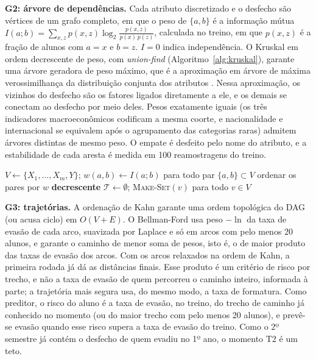 \textbf{G2: árvore de dependências.} Cada atributo discretizado e o desfecho são vértices de um grafo completo, em que o peso de $\{a,b\}$ é a informação mútua
$I(a;b)=\sum_{x,z} p(x,z)\log_2\frac{p(x,z)}{p(x)\,p(z)}$,
calculada no treino, em que $p(x,z)$ é a fração de alunos com $a=x$ e $b=z$. $I=0$ indica independência. O Kruskal em ordem decrescente de peso, com \textit{union-find} (Algoritmo~\ref{alg:kruskal}), garante uma árvore geradora de peso máximo, que é a aproximação em árvore de máxima verossimilhança da distribuição conjunta dos atributos \citep{chow1968}. Nessa aproximação, os vizinhos do desfecho são os fatores ligados diretamente a ele, e os demais se conectam ao desfecho por meio deles. Pesos exatamente iguais (os três indicadores macroeconômicos codificam a mesma coorte, e nacionalidade e internacional se equivalem após o agrupamento das categorias raras) admitem árvores distintas de mesmo peso. O empate é desfeito pelo nome do atributo, e a estabilidade de cada aresta é medida em 100 reamostragens do treino.

\begin{algorithm}[ht!]
\small
\algportugues
{}
$V \leftarrow \{X_1,\dots,X_m,Y\}$; \quad $w(a,b) \leftarrow I(a;b)$ para todo par $\{a,b\}\subset V$\;
ordenar os pares por $w$ \textbf{decrescente} 
$\mathcal{T} \leftarrow \emptyset$; \textsc{Make-Set}$(v)$ para todo $v\in V$\;
\;
\caption{Árvore geradora máxima de informação mútua (Kruskal)}
\label{alg:kruskal}
\end{algorithm}

\textbf{G3: trajetórias.} A ordenação de Kahn garante uma ordem topológica do DAG (ou acusa ciclo) em $O(V+E)$. O Bellman-Ford usa peso $-\ln$ da taxa de evasão de cada arco, suavizada por Laplace e só em arcos com pelo menos 20 alunos, e garante o caminho de menor soma de pesos, isto é, o de maior produto das taxas de evasão dos arcos. Com os arcos relaxados na ordem de Kahn, a primeira rodada já dá as distâncias finais. Esse produto é um critério de risco por trecho, e não a taxa de evasão de quem percorreu o caminho inteiro, informada à parte; a trajetória mais segura usa, do mesmo modo, a taxa de formatura. Como preditor, o risco do aluno é a taxa de evasão, no treino, do trecho de caminho já conhecido no momento (ou do maior trecho com pelo menos 20 alunos), e prevê-se evasão quando esse risco supera a taxa de evasão do treino. Como o 2º semestre já contém o desfecho de quem evadiu no 1º ano, o momento T2 é um teto.

